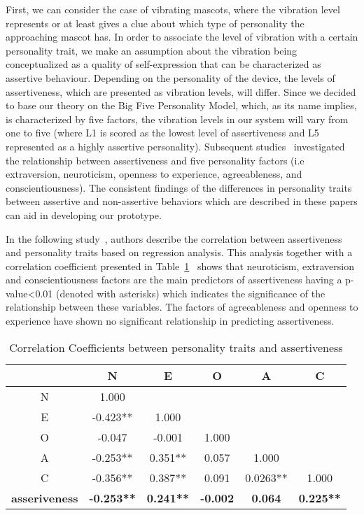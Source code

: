 First, we can consider the case of vibrating mascots, where the vibration level
represents or at least gives a clue about which type of personality the approaching mascot has.
In order to associate the level of vibration with a certain personality trait,
we make an assumption about the vibration being conceptualized as a quality of self-expression
that can be characterized as assertive behaviour.
Depending on the personality of the device, the levels of assertiveness,
which are presented as vibration levels, will differ.
Since we decided to base our theory on the Big Five Personality Model, which, as its name implies, is characterized
by five factors, the vibration levels in our system will vary from one to five (where L1 is scored
as the lowest level of assertiveness and L5 represented as a highly assertive personality).
Subsequent studies~\cite{bagherianrelationship,kirst2011investigating,ramanaiah1993neo,lefevre1981assertiveness}
investigated the relationship between assertiveness and five personality factors (i.e extraversion, neuroticism,
openness to experience, agreeableness, and conscientiousness).
The consistent findings of the differences in personality traits between assertive and
non-assertive behaviors which are described in these papers can aid in developing our prototype.

In the following study~\cite{bagherianrelationship}, authors describe the correlation between
assertiveness and personality traits based on regression analysis.
This analysis together with a correlation coefficient
presented in Table~\ref{table:assertiveness}~\cite{bagherianrelationship} shows that neuroticism,
extraversion and conscientiousness factors are the main predictors of assertiveness
having a p-value\textless 0.01 (denoted with asterisks) which indicates the significance of the
relationship between these variables.
The factors of agreeableness and openness to experience have shown
no significant relationship in predicting assertiveness.

\begin{table} [h]
\centering
\begin{tabular}{c c c c c c} 
\\
 \hline \hline
						& \textbf{N} 			&\textbf{E}		&\textbf{O}		&\textbf{A}		&\textbf{C}	\\ [0.5ex] 
 \hline
 N 						& 1.000 				&				&				&				&	\\ 
 E 						& -0.423** 			&1.000			&				&				&	\\
 O 						& -0.047 				&-0.001			&1.000			&				&	\\
 A 						& -0.253** 			&0.351**			&0.057			&1.000			&	\\
 C 						& -0.356** 			&0.387**			&0.091			&0.0263**			&1.000	\\ [1ex] 
 \hline
 \textbf{asseriveness}  		& \textbf{-0.253**}		&\textbf{0.241**}	&\textbf{-0.002}		&\textbf{0.064}		&\textbf{0.225**}	\\
 \hline \hline
 \end{tabular}
\caption{Correlation Coefficients between personality traits and assertiveness}
 \label{table:assertiveness}
 \end{table}
 
